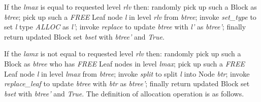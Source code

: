 If the \emph{lmax} is equal to requested level \emph{rlv} then: randomly pick up such a Block as \emph{btree}; pick up such a \emph{FREE} Leaf node \emph{l} in level \emph{rlv} from \emph{btree}; invoke \emph{set\_type} to set \emph{l} type \emph{ALLOC} as \emph{l'}; invoke \emph{replace} to update \emph{btree} with \emph{l'} as \emph{btree'}; finally return updated Block set \emph{bset} with \emph{btree'} and \emph{True}.

If the \emph{lamx} is not equal to requested level \emph{rlv} then: randomly pick up such a Block as \emph{btree} who has \emph{FREE} Leaf nodes in level \emph{lmax}; pick up such a \emph{FREE} Leaf node \emph{l} in level \emph{lmax} from \emph{btree}; invoke \emph{split} to split \emph{l} into Node \emph{btr}; invoke \emph{replace\_leaf} to update \emph{btree} with \emph{btr} as \emph{btree'}; finally return updated Block set \emph{bset} with \emph{btree'} and \emph{True}. The definition of allocation operation is as follows.

